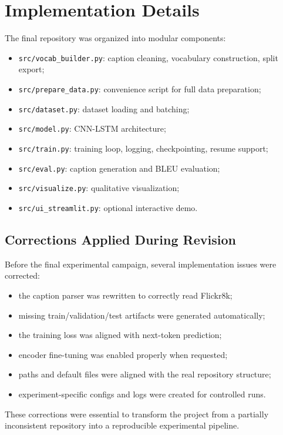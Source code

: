 \documentclass[11pt,a4paper]{article}
\begin{document}
\section{Implementation Details}

The final repository was organized into modular components:
\begin{itemize}[leftmargin=*]
    \item \texttt{src/vocab\_builder.py}: caption cleaning, vocabulary construction, split export;
    \item \texttt{src/prepare\_data.py}: convenience script for full data preparation;
    \item \texttt{src/dataset.py}: dataset loading and batching;
    \item \texttt{src/model.py}: CNN-LSTM architecture;
    \item \texttt{src/train.py}: training loop, logging, checkpointing, resume support;
    \item \texttt{src/eval.py}: caption generation and BLEU evaluation;
    \item \texttt{src/visualize.py}: qualitative visualization;
    \item \texttt{src/ui\_streamlit.py}: optional interactive demo.
\end{itemize}

\subsection{Corrections Applied During Revision}

Before the final experimental campaign, several implementation issues were corrected:
\begin{itemize}[leftmargin=*]
    \item the caption parser was rewritten to correctly read Flickr8k;
    \item missing train/validation/test artifacts were generated automatically;
    \item the training loss was aligned with next-token prediction;
    \item encoder fine-tuning was enabled properly when requested;
    \item paths and default files were aligned with the real repository structure;
    \item experiment-specific configs and logs were created for controlled runs.
\end{itemize}

These corrections were essential to transform the project from a partially inconsistent repository into a reproducible experimental pipeline.
\end{document}
